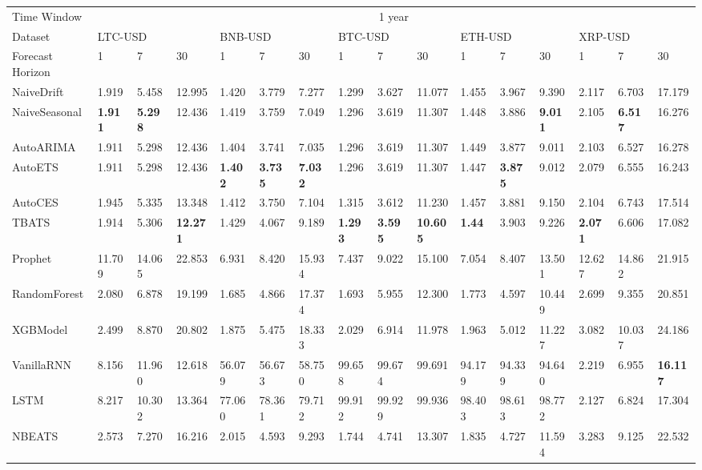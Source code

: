 \begin{tabular}{llllllllllllllll}
\toprule
Time Window & \multicolumn{15}{c}{1 year} \\
Dataset & \multicolumn{3}{l}{LTC-USD} & \multicolumn{3}{l}{BNB-USD} & \multicolumn{3}{l}{BTC-USD} & \multicolumn{3}{l}{ETH-USD} & \multicolumn{3}{l}{XRP-USD} \\
Forecast Horizon & 1 & 7 & 30 & 1 & 7 & 30 & 1 & 7 & 30 & 1 & 7 & 30 & 1 & 7 & 30 \\
\midrule
NaiveDrift & 1.919 & 5.458 & 12.995 & 1.420 & 3.779 & 7.277 & 1.299 & 3.627 & 11.077 & 1.455 & 3.967 & 9.390 & 2.117 & 6.703 & 17.179 \\
NaiveSeasonal & \textbf{1.911} & \textbf{5.298} & 12.436 & 1.419 & 3.759 & 7.049 & 1.296 & 3.619 & 11.307 & 1.448 & 3.886 & \textbf{9.011} & 2.105 & \textbf{6.517} & 16.276 \\
AutoARIMA & 1.911 & 5.298 & 12.436 & 1.404 & 3.741 & 7.035 & 1.296 & 3.619 & 11.307 & 1.449 & 3.877 & 9.011 & 2.103 & 6.527 & 16.278 \\
AutoETS & 1.911 & 5.298 & 12.436 & \textbf{1.402} & \textbf{3.735} & \textbf{7.032} & 1.296 & 3.619 & 11.307 & 1.447 & \textbf{3.875} & 9.012 & 2.079 & 6.555 & 16.243 \\
AutoCES & 1.945 & 5.335 & 13.348 & 1.412 & 3.750 & 7.104 & 1.315 & 3.612 & 11.230 & 1.457 & 3.881 & 9.150 & 2.104 & 6.743 & 17.514 \\
TBATS & 1.914 & 5.306 & \textbf{12.271} & 1.429 & 4.067 & 9.189 & \textbf{1.293} & \textbf{3.595} & \textbf{10.605} & \textbf{1.44} & 3.903 & 9.226 & \textbf{2.071} & 6.606 & 17.082 \\
Prophet & 11.709 & 14.065 & 22.853 & 6.931 & 8.420 & 15.934 & 7.437 & 9.022 & 15.100 & 7.054 & 8.407 & 13.501 & 12.627 & 14.862 & 21.915 \\
RandomForest & 2.080 & 6.878 & 19.199 & 1.685 & 4.866 & 17.374 & 1.693 & 5.955 & 12.300 & 1.773 & 4.597 & 10.449 & 2.699 & 9.355 & 20.851 \\
XGBModel & 2.499 & 8.870 & 20.802 & 1.875 & 5.475 & 18.333 & 2.029 & 6.914 & 11.978 & 1.963 & 5.012 & 11.227 & 3.082 & 10.037 & 24.186 \\
VanillaRNN & 8.156 & 11.960 & 12.618 & 56.079 & 56.673 & 58.750 & 99.658 & 99.674 & 99.691 & 94.179 & 94.339 & 94.640 & 2.219 & 6.955 & \textbf{16.117} \\
LSTM & 8.217 & 10.302 & 13.364 & 77.060 & 78.361 & 79.712 & 99.912 & 99.929 & 99.936 & 98.403 & 98.613 & 98.772 & 2.127 & 6.824 & 17.304 \\
NBEATS & 2.573 & 7.270 & 16.216 & 2.015 & 4.593 & 9.293 & 1.744 & 4.741 & 13.307 & 1.835 & 4.727 & 11.594 & 3.283 & 9.125 & 22.532 \\
\bottomrule
\end{tabular}
